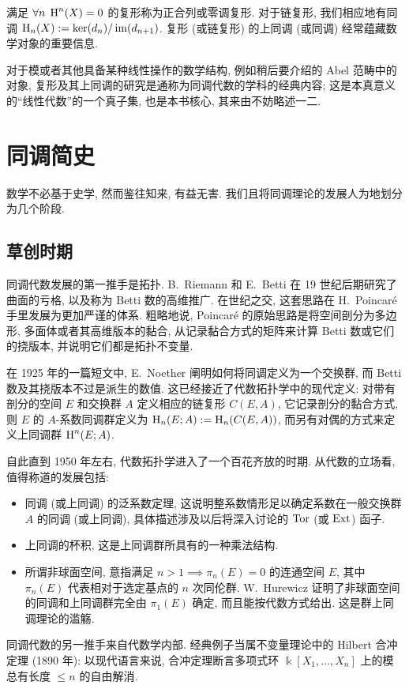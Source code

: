 满足 $\forall n \; \operatorname{H}^n(X) = 0$ 的复形称为正合列或零调复形. 对于链复形, 我们相应地有同调 $\operatorname{H}_n(X) := \operatorname{ker}(d_n) / \operatorname{im}(d_{n+1})$. 复形 (或链复形) 的上同调 (或同调) 经常蕴藏数学对象的重要信息.

对于模或者其他具备某种线性操作的数学结构, 例如稍后要介绍的 Abel 范畴中的对象, 复形及其上同调的研究是通称为同调代数的学科的经典内容; 这是本真意义的``线性代数''的一个真子集, 也是本书核心, 其来由不妨略述一二.

\section*{同调简史}
数学不必基于史学, 然而鉴往知来, 有益无害. 我们且将同调理论的发展人为地划分为几个阶段.

\subsection*{草创时期}
同调代数发展的第一推手是拓扑. B.\ Riemann 和 E.\ Betti 在 19 世纪后期研究了曲面的亏格, 以及称为 Betti 数的高维推广. 在世纪之交, 这套思路在 H.\ Poincaré 手里发展为更加严谨的体系. 粗略地说, Poincaré 的原始思路是将空间剖分为多边形, 多面体或者其高维版本的黏合, 从记录黏合方式的矩阵来计算 Betti 数或它们的挠版本, 并说明它们都是拓扑不变量.

在 1925 年的一篇短文中, E.\ Noether 阐明如何将同调定义为一个交换群, 而 Betti 数及其挠版本不过是派生的数值. 这已经接近了代数拓扑学中的现代定义: 对带有剖分的空间 $E$ 和交换群 $A$ 定义相应的链复形 $C(E, A)$, 它记录剖分的黏合方式, 则 $E$ 的 $A$-系数同调群定义为 $\operatorname{H}_n(E; A) := \operatorname{H}_n(C(E, A))$, 而另有对偶的方式来定义上同调群 $\operatorname{H}^n(E; A)$.

自此直到 1950 年左右, 代数拓扑学进入了一个百花齐放的时期. 从代数的立场看, 值得称道的发展包括:
\begin{itemize}
	\item 同调 (或上同调) 的泛系数定理, 这说明整系数情形足以确定系数在一般交换群 $A$ 的同调 (或上同调), 具体描述涉及以后将深入讨论的 $\operatorname{Tor}$ (或 $\operatorname{Ext}$) 函子.
	\item 上同调的杯积, 这是上同调群所具有的一种乘法结构.
	\item 所谓非球面空间, 意指满足 $n > 1 \implies \pi_n(E) = 0$ 的连通空间 $E$, 其中 $\pi_n(E)$ 代表相对于选定基点的 $n$ 次同伦群. W.\ Hurewicz 证明了非球面空间的同调和上同调群完全由 $\pi_1(E)$ 确定, 而且能按代数方式给出. 这是群上同调理论的滥觞.
\end{itemize}

同调代数的另一推手来自代数学内部. 经典例子当属不变量理论中的 Hilbert 合冲定理 (1890 年): 以现代语言来说, 合冲定理断言多项式环 $\Bbbk[X_1, \ldots, X_n]$ 上的模总有长度 $\leq n$ 的自由解消.

